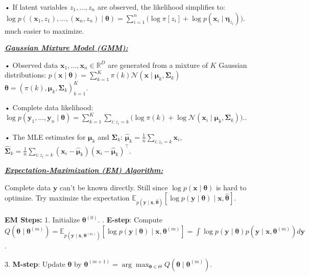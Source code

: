 \documentclass[10pt]{article}
\newcommand{\bulletPoint}[1]{\ul{\textit{\textbf{#1}}}}
\begin{document}
\begin{multicols*}{3}
• If latent variables $z_1, \dots, z_n$ are observed, the likelihood simplifies to:
$\log p((\mathbf{x}_1, z_1), \dots, (\mathbf{x}_n, z_n) \mid \boldsymbol{\theta}) = \sum_{i=1}^{n} \big( \log \pi[z_i] + \log p(\mathbf{x}_i \mid \boldsymbol{\eta}_{z_i}) \big)$.
much easier to maximize.


\bulletPoint{Gaussian Mixture Model (GMM):}\quad

• Observed data $\mathbf{x}_1, \dots, \mathbf{x}_n \in \mathbb{R}^{D}$ are generated from a mixture of $K$ Gaussian distributions:
$p(\mathbf{x} \mid \boldsymbol{\theta}) = \sum_{k=1}^{K} \pi(k) \mathcal{N} (\mathbf{x} \mid \boldsymbol{\mu}_k, \boldsymbol{\Sigma}_k)$
$\boldsymbol{\theta} = (\pi(k), \boldsymbol{\mu}_k, \boldsymbol{\Sigma}_k)_{k=1}^{K}$. 

• Complete data likelihood:
$\log p(\mathbf{y}_1, \dots, \mathbf{y}_n \mid \boldsymbol{\theta}) = \sum_{k=1}^{K} \sum_{i: z_i = k} \big( \log \pi(k) + \log \mathcal{N} (\mathbf{x}_i \mid \boldsymbol{\mu}_k, \boldsymbol{\Sigma}_k) \big).$. 

• The MLE estimates for $\boldsymbol{\mu}_k$ and $\boldsymbol{\Sigma}_k$:
$ \hat{\boldsymbol{\mu}}_k = \frac{1}{n} \sum_{i: z_i = k} \mathbf{x}_i, $ 
$ \hat{\boldsymbol{\Sigma}}_k = \frac{1}{n} \sum_{i: z_i = k} (\mathbf{x}_i - \hat{\boldsymbol{\mu}}_k)(\mathbf{x}_i - \hat{\boldsymbol{\mu}}_k)^{\top} $.

\bulletPoint{Expectation-Maximization (EM) Algorithm:}\quad

Complete data $\mathbf{y}$ can't be known directly. Still since $\log p(\mathbf{x} \mid \boldsymbol{\theta})$ is hard to optimize. Try maximize the expectation $\mathbb{E}_{p(\mathbf{y} \mid \mathbf{x}, \hat{\boldsymbol{\theta}})} \left[ \log p(\mathbf{y} \mid \boldsymbol{\theta}) \mid \mathbf{x}, \hat{\boldsymbol{\theta}} \right]$. 

\textbf{EM Steps:} 1. Initialize $\boldsymbol{\theta}^{(0)}$. . \textbf{E-step}: Compute $Q(\boldsymbol{\theta} \mid \boldsymbol{\theta}^{(m)}) = \mathbb{E}_{p(\mathbf{y} \mid \mathbf{x}, \boldsymbol{\theta}^{(m)})} \left[ \log p(\mathbf{y} \mid \boldsymbol{\theta}) \mid \mathbf{x}, \boldsymbol{\theta}^{(m)} \right] = \int \log p(\mathbf{y} \mid \boldsymbol{\theta}) p(\mathbf{y} \mid \mathbf{x}, \boldsymbol{\theta}^{(m)}) d\mathbf{y}$. \quad

3. \textbf{M-step}: Update $\boldsymbol{\theta}$ by $\boldsymbol{\theta}^{(m+1)} = \arg\max_{\boldsymbol{\theta} \in \Theta} Q(\boldsymbol{\theta} \mid \boldsymbol{\theta}^{(m)})$. 


\end{multicols*}
\end{document}
